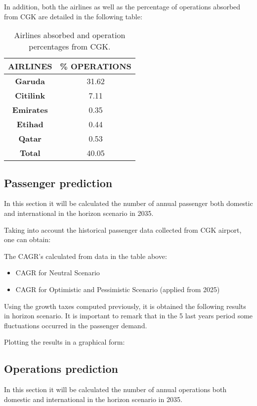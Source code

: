 In addition, both the airlines as well as the percentage of operations absorbed from CGK are detailed in the following table:

	\begin{table}[ht!]
	\label{table:AirlinesAbsorbed}
	\centering
	\begin{tabular}{|c|c|}
		\hline
		\textbf{AIRLINES} & \textbf{\% OPERATIONS}\\
		\hline
		\textbf{Garuda} & 31.62\\
		\hline
		\textbf{Citilink} & 7.11\\
		\hline
		\textbf{Emirates} & 0.35\\
		\hline
		\textbf{Etihad} & 0.44\\
		\hline
		\textbf{Qatar} & 0.53\\
		\hline
		\textbf{Total} & 40.05\\
		\hline
	\end{tabular}
	\caption{Airlines absorbed and operation percentages from CGK.}
	\end{table}

	\subsection{Passenger prediction}
In this section it will be calculated the number of annual passenger both domestic and international in the horizon scenario in 2035.
 
Taking into account the historical passenger data collected from CGK airport, one can obtain:

The CAGR's calculated from  data in the table above:
 \begin{itemize}
 	\item CAGR for Neutral Scenario
 	
 	\item CAGR for Optimistic and Pessimistic Scenario (applied from 2025)
 \end{itemize}
	
Using the growth taxes computed previously, it is obtained the following results in horizon scenario. It is important to remark that in the 5 last years period some fluctuations occurred in the passenger demand.

Plotting the results in a graphical form:
	
	\subsection{Operations prediction}
In this section it will be calculated the number of annual operations both domestic and international in the horizon scenario in 2035.
	
